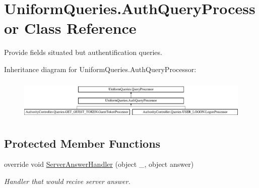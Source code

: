 \hypertarget{class_uniform_queries_1_1_auth_query_processor}{}\section{Uniform\+Queries.\+Auth\+Query\+Processor Class Reference}
\label{class_uniform_queries_1_1_auth_query_processor}


Provide fields situated but authentification queries.  


Inheritance diagram for Uniform\+Queries.\+Auth\+Query\+Processor\+:\begin{figure}[H]
\begin{center}
\leavevmode
\includegraphics[height=1.962617cm]{d9/de6/class_uniform_queries_1_1_auth_query_processor}
\end{center}
\end{figure}
\subsection*{Protected Member Functions}
\begin{DoxyCompactItemize}
\item 
override void \mbox{\hyperlink{class_uniform_queries_1_1_auth_query_processor_a09d3f6d361c09c0726a880a92191f3fd}{Server\+Answer\+Handler}} (object \+\_\+, object answer)
\begin{DoxyCompactList}\small\item\em Handler that would recive server answer. \end{DoxyCompactList}\end{DoxyCompactItemize}
